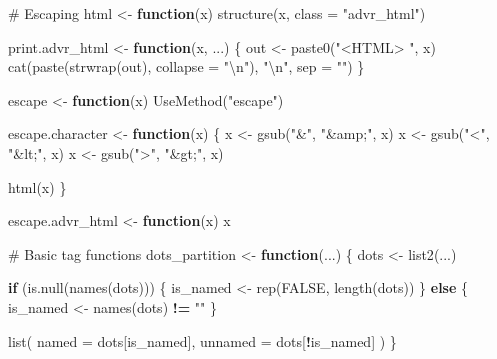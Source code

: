 \documentclass[
]{krantz}
\makeatletter
\newenvironment{Shaded}{\begin{snugshade}}{\end{snugshade}}
\newcommand{\CharTok}[1]{\textcolor[rgb]{0.31,0.60,0.02}{#1}}
\newcommand{\CommentTok}[1]{\textcolor[rgb]{0.56,0.35,0.01}{\textit{#1}}}
\newcommand{\ControlFlowTok}[1]{\textcolor[rgb]{0.13,0.29,0.53}{\textbf{#1}}}
\newcommand{\DataTypeTok}[1]{\textcolor[rgb]{0.13,0.29,0.53}{#1}}
\newcommand{\KeywordTok}[1]{\textcolor[rgb]{0.13,0.29,0.53}{\textbf{#1}}}
\newcommand{\NormalTok}[1]{#1}
\newcommand{\OperatorTok}[1]{\textcolor[rgb]{0.81,0.36,0.00}{\textbf{#1}}}
\newcommand{\OtherTok}[1]{\textcolor[rgb]{0.56,0.35,0.01}{#1}}
\newcommand{\StringTok}[1]{\textcolor[rgb]{0.31,0.60,0.02}{#1}}
\newenvironment{kframe}{%
\medskip{}
\setlength{\fboxsep}{.8em}
 \def\at@end@of@kframe{}%
 \ifinner\ifhmode%
  \def\at@end@of@kframe{\end{minipage}}%
  \begin{minipage}{\columnwidth}%
 \fi\fi%
 \def\FrameCommand##1{\hskip\@totalleftmargin \hskip-\fboxsep
 \colorbox{shadecolor}{##1}\hskip-\fboxsep
     \hskip-\linewidth \hskip-\@totalleftmargin \hskip\columnwidth}%
 \MakeFramed {\advance\hsize-\width
   \@totalleftmargin\z@ \linewidth\hsize
   \@setminipage}}%
 {\par\unskip\endMakeFramed%
 \at@end@of@kframe}
\renewenvironment{Shaded}{\begin{kframe}}{\end{kframe}}
\renewcommand{\KeywordTok} [1]{\textcolor[rgb]{0.00,0.44,0.13}{{#1}}}
\renewcommand{\DataTypeTok}[1]{\textcolor[rgb]{0.56,0.13,0.00}{{#1}}}
\renewcommand{\CharTok}    [1]{\textcolor[rgb]{0.25,0.44,0.63}{{#1}}}
\renewcommand{\StringTok}  [1]{\textcolor[rgb]{0.25,0.44,0.63}{{#1}}}
\renewcommand{\CommentTok} [1]{\textcolor[rgb]{0.38,0.63,0.69}{{#1}}}
\renewcommand{\OtherTok}   [1]{\textcolor[rgb]{0.00,0.44,0.13}{{#1}}}
\renewcommand{\NormalTok}  [1]{{#1}}
\makeatother
\begin{document}
\begin{Shaded}
\begin{Highlighting}[]
\CommentTok{# Escaping}
\NormalTok{html <-}\StringTok{ }\ControlFlowTok{function}\NormalTok{(x) }\KeywordTok{structure}\NormalTok{(x, }\DataTypeTok{class =} \StringTok{"advr_html"}\NormalTok{)}

\NormalTok{print.advr_html <-}\StringTok{ }\ControlFlowTok{function}\NormalTok{(x, ...) \{}
\NormalTok{  out <-}\StringTok{ }\KeywordTok{paste0}\NormalTok{(}\StringTok{"<HTML> "}\NormalTok{, x)}
  \KeywordTok{cat}\NormalTok{(}\KeywordTok{paste}\NormalTok{(}\KeywordTok{strwrap}\NormalTok{(out), }\DataTypeTok{collapse =} \StringTok{"}\CharTok{\textbackslash{}n}\StringTok{"}\NormalTok{), }\StringTok{"}\CharTok{\textbackslash{}n}\StringTok{"}\NormalTok{, }\DataTypeTok{sep =} \StringTok{""}\NormalTok{)}
\NormalTok{\}}

\NormalTok{escape <-}\StringTok{ }\ControlFlowTok{function}\NormalTok{(x) }\KeywordTok{UseMethod}\NormalTok{(}\StringTok{"escape"}\NormalTok{)}

\NormalTok{escape.character <-}\StringTok{ }\ControlFlowTok{function}\NormalTok{(x) \{}
\NormalTok{  x <-}\StringTok{ }\KeywordTok{gsub}\NormalTok{(}\StringTok{"&"}\NormalTok{, }\StringTok{"&amp;"}\NormalTok{, x)}
\NormalTok{  x <-}\StringTok{ }\KeywordTok{gsub}\NormalTok{(}\StringTok{"<"}\NormalTok{, }\StringTok{"&lt;"}\NormalTok{, x)}
\NormalTok{  x <-}\StringTok{ }\KeywordTok{gsub}\NormalTok{(}\StringTok{">"}\NormalTok{, }\StringTok{"&gt;"}\NormalTok{, x)}
  
  \KeywordTok{html}\NormalTok{(x)}
\NormalTok{\}}

\NormalTok{escape.advr_html <-}\StringTok{ }\ControlFlowTok{function}\NormalTok{(x) x}

\CommentTok{# Basic tag functions}
\NormalTok{dots_partition <-}\StringTok{ }\ControlFlowTok{function}\NormalTok{(...) \{}
\NormalTok{  dots <-}\StringTok{ }\KeywordTok{list2}\NormalTok{(...)}
  
  \ControlFlowTok{if}\NormalTok{ (}\KeywordTok{is.null}\NormalTok{(}\KeywordTok{names}\NormalTok{(dots))) \{}
\NormalTok{    is_named <-}\StringTok{ }\KeywordTok{rep}\NormalTok{(}\OtherTok{FALSE}\NormalTok{, }\KeywordTok{length}\NormalTok{(dots))}
\NormalTok{  \} }\ControlFlowTok{else}\NormalTok{ \{}
\NormalTok{    is_named <-}\StringTok{ }\KeywordTok{names}\NormalTok{(dots) }\OperatorTok{!=}\StringTok{ ""}
\NormalTok{  \}}
  
  \KeywordTok{list}\NormalTok{(}
    \DataTypeTok{named =}\NormalTok{ dots[is_named],}
    \DataTypeTok{unnamed =}\NormalTok{ dots[}\OperatorTok{!}\NormalTok{is_named]}
\NormalTok{  )}
\NormalTok{\}}


\end{Highlighting}
\end{Shaded}
\end{document}
